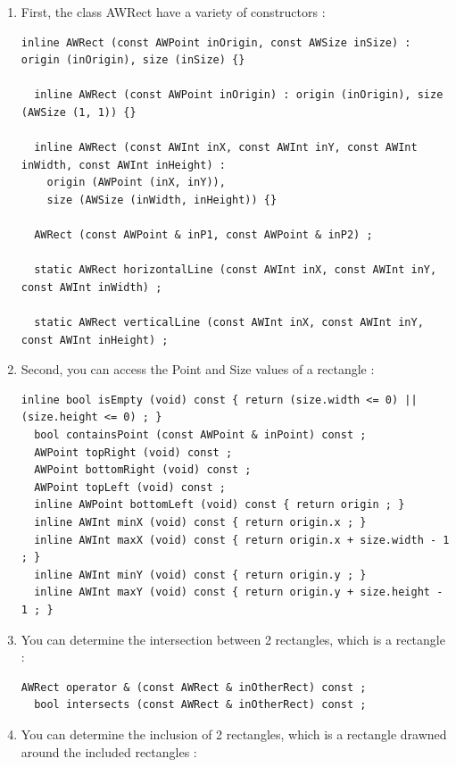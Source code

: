 \documentclass[a4paper,11pt]{extarticle}
\begin{document}
\begin{enumerate}
\item First, the class AWRect have a variety of constructors :

\begin{lstlisting}[language=Arduinonl]
  inline AWRect (const AWPoint inOrigin, const AWSize inSize) : origin (inOrigin), size (inSize) {}
  
  inline AWRect (const AWPoint inOrigin) : origin (inOrigin), size (AWSize (1, 1)) {}
  
  inline AWRect (const AWInt inX, const AWInt inY, const AWInt inWidth, const AWInt inHeight) :
  	origin (AWPoint (inX, inY)),
  	size (AWSize (inWidth, inHeight)) {}
	
  AWRect (const AWPoint & inP1, const AWPoint & inP2) ;
  
  static AWRect horizontalLine (const AWInt inX, const AWInt inY, const AWInt inWidth) ;
  
  static AWRect verticalLine (const AWInt inX, const AWInt inY, const AWInt inHeight) ;
\end{lstlisting}

\item Second, you can access the Point and Size values of a rectangle :

\begin{lstlisting}[language=Arduinonl]
  inline bool isEmpty (void) const { return (size.width <= 0) || (size.height <= 0) ; }
  bool containsPoint (const AWPoint & inPoint) const ;
  AWPoint topRight (void) const ;
  AWPoint bottomRight (void) const ;
  AWPoint topLeft (void) const ;
  inline AWPoint bottomLeft (void) const { return origin ; }
  inline AWInt minX (void) const { return origin.x ; }
  inline AWInt maxX (void) const { return origin.x + size.width - 1 ; }
  inline AWInt minY (void) const { return origin.y ; }
  inline AWInt maxY (void) const { return origin.y + size.height - 1 ; }
\end{lstlisting}

\item You can determine the intersection between 2 rectangles, which is a rectangle :

\begin{lstlisting}[language=Arduinonl]
  AWRect operator & (const AWRect & inOtherRect) const ;
  bool intersects (const AWRect & inOtherRect) const ;
\end{lstlisting}

\item You can determine the inclusion of 2 rectangles, which is a rectangle drawned around the included rectangles :


\end{enumerate}
\end{document}
